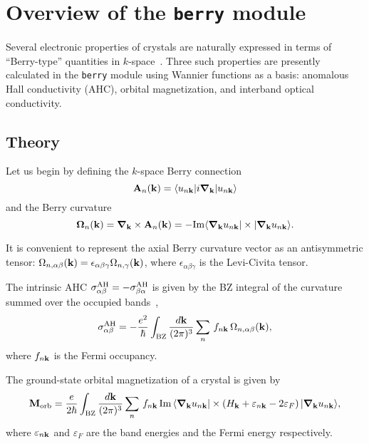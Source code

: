 \chapter{Overview of the {\tt berry} module}
\label{ch:berry}

Several electronic properties of crystals are naturally expressed in
terms of ``Berry-type'' quantities in $k$-space~\cite{xiao-rmp10}.
Three such properties are presently calculated in the {\tt berry}
module using Wannier functions as a basis: anomalous Hall conductivity
(AHC), orbital magnetization, and interband optical conductivity.

\section{Theory}

Let us begin by defining the $k$-space Berry connection
%
$$
{\bf A}_n({\bf k})=\langle u_{n{\bf k}}\vert i\bm{\nabla}_{\bf k}\vert
u_{n{\bf k}}\rangle
$$
%
and the Berry curvature
%
$$
\bm{\Omega}_n({\bf k})=\bm{\nabla}_{\bf k}\times {\bf A}_n({\bf k})=
-{\rm Im}
\langle \bm{\nabla}_{\bf k} u_{n{\bf k}}\vert \times
\vert\bm{\nabla}_{\bf k} u_{n{\bf k}}\rangle.
$$

It is convenient to represent the axial Berry curvature vector as an
antisymmetric tensor: $ \Omega_{n,\alpha\beta}({\bf k})
=\epsilon_{\alpha\beta\gamma} \Omega_{n,\gamma}({\bf k})$, where
$\epsilon_{\alpha\beta\gamma}$ is the Levi-Civita tensor.

The
intrinsic AHC $\sigma^{\rm AH}_{\alpha\beta}=-\sigma^{\rm
  AH}_{\beta\alpha}$ is given by the BZ integral of the curvature
summed over the occupied bands~\cite{xiao-rmp10},
%
$$
\sigma^{\rm AH}_{\alpha\beta}=-\frac{e^2}{\hbar} \int_{\rm
  BZ}\frac{d{\bf k}}{(2\pi)^3}\sum_n\,f_{n{\bf
    k}}\,\Omega_{n,\alpha\beta}({\bf k}),
$$
%
where $f_{n{\bf k}}$ is the Fermi occupancy.

The ground-state orbital magnetization of a crystal is given
by~\cite{xiao-rmp10,ceresoli-prb06}
%
$$
{\bf M}_{\rm orb}=\frac{e}{2\hbar}\int_{\rm BZ}\frac{d{\bf
    k}}{(2\pi)^3}\sum_n\,f_{n{\bf k}}\,
{\rm Im}\,\langle \bm{\nabla}_{\bf k}u_{n{\bf k}}\vert
\times
\left(H_{\bf k}+\varepsilon_{n{\bf k}}-2\varepsilon_F\right)
\vert \bm{\nabla}_{\bf k}u_{n{\bf k}}\rangle,
$$
%
where $\varepsilon_{n{\bf k}}$ and $\varepsilon_F$ are
the band energies and the Fermi energy respectively.

